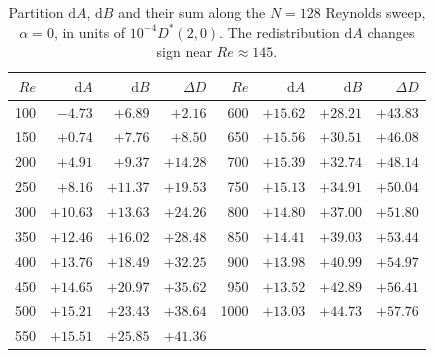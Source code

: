 \begin{table}[!htbp]
\centering
\caption{Partition $\mathrm{d}A$, $\mathrm{d}B$ and their sum along the $N=128$ Reynolds sweep, $\alpha=0$, in units of $10^{-4}D^*(2,0)$. The redistribution $\mathrm{d}A$ changes sign near $Re\approx145$.}
\label{supptab:dadb}
\begin{tabular}{@{}r|rrr@{\hskip 18pt}r|rrr@{}}
\hline
$Re$ & $\mathrm{d}A$ & $\mathrm{d}B$ & $\Delta D$ & $Re$ & $\mathrm{d}A$ & $\mathrm{d}B$ & $\Delta D$ \\
\hline
100 & $-4.73$ & $+6.89$ & $+2.16$ & 600 & $+15.62$ & $+28.21$ & $+43.83$ \\
150 & $+0.74$ & $+7.76$ & $+8.50$ & 650 & $+15.56$ & $+30.51$ & $+46.08$ \\
200 & $+4.91$ & $+9.37$ & $+14.28$ & 700 & $+15.39$ & $+32.74$ & $+48.14$ \\
250 & $+8.16$ & $+11.37$ & $+19.53$ & 750 & $+15.13$ & $+34.91$ & $+50.04$ \\
300 & $+10.63$ & $+13.63$ & $+24.26$ & 800 & $+14.80$ & $+37.00$ & $+51.80$ \\
350 & $+12.46$ & $+16.02$ & $+28.48$ & 850 & $+14.41$ & $+39.03$ & $+53.44$ \\
400 & $+13.76$ & $+18.49$ & $+32.25$ & 900 & $+13.98$ & $+40.99$ & $+54.97$ \\
450 & $+14.65$ & $+20.97$ & $+35.62$ & 950 & $+13.52$ & $+42.89$ & $+56.41$ \\
500 & $+15.21$ & $+23.43$ & $+38.64$ & 1000 & $+13.03$ & $+44.73$ & $+57.76$ \\
550 & $+15.51$ & $+25.85$ & $+41.36$ & & & & \\
\hline
\end{tabular}
\end{table}

